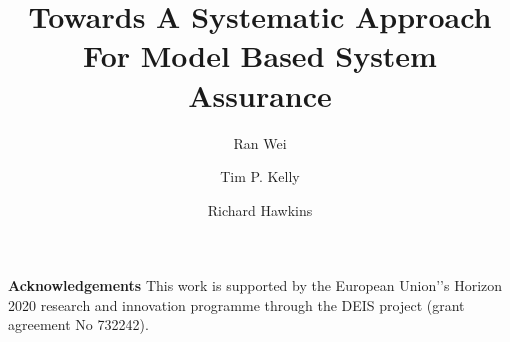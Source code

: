 \documentclass[runningheads,a4paper]{llncs}
\begin{document}
 
\title{\textbf{Towards A Systematic Approach For Model Based System Assurance}}
\author{Ran Wei \and Tim P. Kelly \and Richard Hawkins}
\maketitle

















\noindent\textbf{Acknowledgements}
This work is supported by the European Union'’s Horizon 2020 research and innovation programme through the DEIS project (grant agreement No 732242). 

 
  
\end{document}

